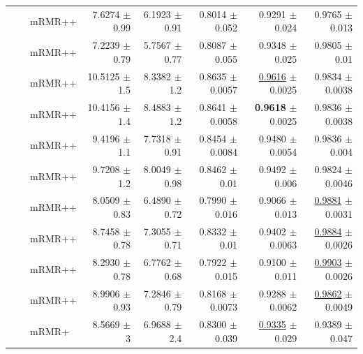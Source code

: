 \begin{longtable}{llp{}rrrrr}
 &  & mRMR++ & 7.6274 {\scriptsize $\pm$ 0.99} & 6.1923 {\scriptsize $\pm$ 0.91} & 0.8014 {\scriptsize $\pm$ 0.052} & 0.9291 {\scriptsize $\pm$ 0.024} & 0.9765 {\scriptsize $\pm$ 0.013} \\
 &  & mRMR++ & 7.2239 {\scriptsize $\pm$ 0.79} & 5.7567 {\scriptsize $\pm$ 0.77} & 0.8087 {\scriptsize $\pm$ 0.055} & 0.9348 {\scriptsize $\pm$ 0.025} & 0.9805 {\scriptsize $\pm$ 0.01} \\
 &  & mRMR++ & 10.5125 {\scriptsize $\pm$ 1.5} & 8.3382 {\scriptsize $\pm$ 1.2} & 0.8635 {\scriptsize $\pm$ 0.0057} & \underline{0.9616} {\scriptsize $\pm$ 0.0025} & 0.9834 {\scriptsize $\pm$ 0.0038} \\
 &  & mRMR++ & 10.4156 {\scriptsize $\pm$ 1.4} & 8.4883 {\scriptsize $\pm$ 1.2} & 0.8641 {\scriptsize $\pm$ 0.0058} & \textbf{0.9618} {\scriptsize $\pm$ 0.0025} & 0.9836 {\scriptsize $\pm$ 0.0038} \\
 &  & mRMR++ & 9.4196 {\scriptsize $\pm$ 1.1} & 7.7318 {\scriptsize $\pm$ 0.91} & 0.8454 {\scriptsize $\pm$ 0.0084} & 0.9480 {\scriptsize $\pm$ 0.0054} & 0.9836 {\scriptsize $\pm$ 0.004} \\
 &  & mRMR++ & 9.7208 {\scriptsize $\pm$ 1.2} & 8.0049 {\scriptsize $\pm$ 0.98} & 0.8462 {\scriptsize $\pm$ 0.01} & 0.9492 {\scriptsize $\pm$ 0.006} & 0.9824 {\scriptsize $\pm$ 0.0046} \\
 &  & mRMR++ & 8.0509 {\scriptsize $\pm$ 0.83} & 6.4890 {\scriptsize $\pm$ 0.72} & 0.7990 {\scriptsize $\pm$ 0.016} & 0.9066 {\scriptsize $\pm$ 0.013} & \underline{0.9881} {\scriptsize $\pm$ 0.0031} \\
 &  & mRMR++ & 8.7458 {\scriptsize $\pm$ 0.78} & 7.3055 {\scriptsize $\pm$ 0.71} & 0.8332 {\scriptsize $\pm$ 0.01} & 0.9402 {\scriptsize $\pm$ 0.0063} & \underline{0.9884} {\scriptsize $\pm$ 0.0026} \\
 &  & mRMR++ & 8.2930 {\scriptsize $\pm$ 0.78} & 6.7762 {\scriptsize $\pm$ 0.68} & 0.7922 {\scriptsize $\pm$ 0.015} & 0.9100 {\scriptsize $\pm$ 0.011} & \underline{0.9903} {\scriptsize $\pm$ 0.0026} \\
 &  & mRMR++ & 8.9906 {\scriptsize $\pm$ 0.93} & 7.2846 {\scriptsize $\pm$ 0.79} & 0.8168 {\scriptsize $\pm$ 0.0073} & 0.9288 {\scriptsize $\pm$ 0.0062} & \underline{0.9862} {\scriptsize $\pm$ 0.0049} \\
 &  & mRMR+ & 8.5669 {\scriptsize $\pm$ 3} & 6.9688 {\scriptsize $\pm$ 2.4} & 0.8300 {\scriptsize $\pm$ 0.039} & \underline{0.9335} {\scriptsize $\pm$ 0.029} & 0.9389 {\scriptsize $\pm$ 0.047} \\

\end{longtable}
